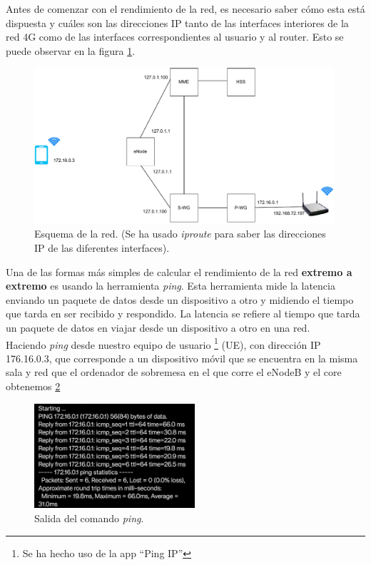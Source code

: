Antes de comenzar con el rendimiento de la red, es necesario saber cómo esta está dispuesta  y cuáles son las direcciones IP tanto de las interfaces interiores de la red 4G como de las interfaces correspondientes al usuario y al router. Esto se puede observar en la figura \ref{fig:EsquemaRed}.

\begin{figure}[H]
    \centering
    \includegraphics[width=0.99\textwidth]{Imagenes/Rendimiento/red.pdf}
    \caption{Esquema de la red. (Se ha usado \textit{iproute} para saber las direcciones IP de las diferentes interfaces).}
    \label{fig:EsquemaRed}
\end{figure}

Una de las formas más simples de calcular el rendimiento de la red \textbf{extremo a extremo} es usando la herramienta \textit{ping}. Esta herramienta mide la latencia enviando un paquete de datos desde un dispositivo a otro y midiendo el tiempo que tarda en ser recibido y respondido. La latencia se refiere al tiempo que tarda un paquete de datos en viajar desde un dispositivo a otro en una red.\\
Haciendo \textit{ping} desde nuestro equipo de usuario \footnote{Se ha hecho uso de la app “Ping IP”} (UE), con dirección IP 176.16.0.3, que corresponde a un dispositivo móvil  que se encuentra en la misma sala y red que el ordenador de sobremesa en el que corre el eNodeB y el core obtenemos \ref{fig:ping} 

 \begin{figure}[H]
    \centering
    \includegraphics[width=0.53\textwidth]{Imagenes/Rendimiento/ping.jpeg}
    \caption{Salida del comando \textit{ping}.}
    \label{fig:ping}
\end{figure}

